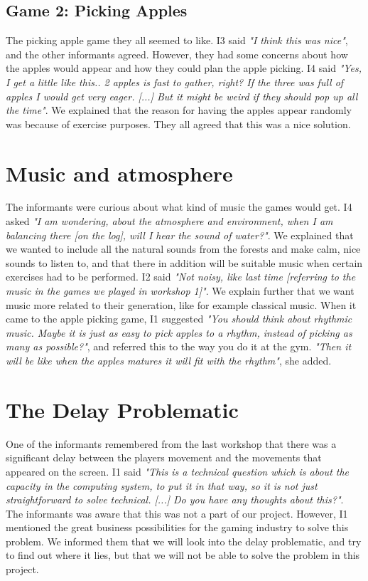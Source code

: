\subsection{Game 2: Picking Apples}

The picking apple game they all seemed to like. I3 said \emph{"I think this was nice"}, and the other informants agreed. However, they had some concerns about how the apples would appear and how they could plan the apple picking. I4 said \emph{"Yes, I get a little like this.. 2 apples is fast to gather, right? If the three was full of apples I would get very eager. [...] But it might be weird if they should pop up all the time"}.  We explained that the reason for having the apples appear randomly was because of exercise purposes. They all agreed that this was a nice solution. 

\section{Music and atmosphere}

The informants were curious about what kind of music the games would get. I4 asked \emph{"I am wondering, about the atmosphere and environment, when I am balancing there [on the log], will I hear the sound of water?"}. We explained that we wanted to include all the natural sounds from the forests and make calm, nice sounds to listen to, and that there in addition will be suitable music when certain exercises had to be performed. I2 said \emph{"Not noisy, like last time [referring to the music in the games we played in workshop 1]"}. We explain further that we want music more related to their generation, like for example classical music. When it came to the apple picking game, I1 suggested \emph{"You should think about rhythmic music. Maybe it is just as easy to pick apples to a rhythm, instead of picking as many as possible?"}, and referred this to the way you do it at the gym. \emph{"Then it will be like when the apples matures it will fit with the rhythm"}, she added. 

\section{The Delay Problematic}

One of the informants remembered from the last workshop that there was a significant delay between the players movement and the movements that appeared on the screen. I1 said \emph{"This is a technical question which is about the capacity in the computing system, to put it in that way, so it is not just straightforward to solve technical. [...] Do you have any thoughts about this?"}. The informants was aware that this was not a part of our project. However, I1 mentioned the great business possibilities for the gaming industry to solve this problem. We informed them that we will look into the delay problematic, and try to find out where it lies, but that we will not be able to solve the problem in this project. 

